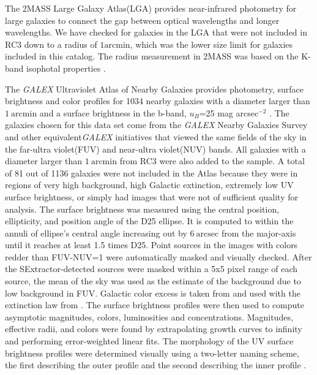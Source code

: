 \documentclass[12pt,preprint,pdftex]{aastex}
\newcommand{\units}[1]{\mathrm{#1}}
\renewcommand{\arcmin}{\units{arcmin}}
\renewcommand{\arcsec}{\units{arcsec}}
\begin{document}
The 2MASS Large Galaxy Atlas(LGA) provides near-infrared photometry for large galaxies to connect the gap between optical wavelengths and longer wavelengths. We have checked for galaxies in the LGA that were not included in RC3 down to a radius of $1\arcmin$, which was the lower size limit for galaxies included in this catalog. The radius measurement in 2MASS was based on the K-band isophotal properties \citep{jarrett03}.  

The \textit{GALEX} Ultraviolet Atlas of Nearby Galaxies provides photometry, surface brightness and color profiles for 1034 nearby galaxies with a diameter larger than $1~\arcmin$ and a surface brightness in the b-band, $u_B$=25 mag arcsec$^{-2}$ . The galaxies chosen for this data set come from the \textit{GALEX} Nearby Galaxies Survey and other equivalent\textit{GALEX} initiatives that viewed the same fields of the sky in the far-ultra violet(FUV) and near-ultra violet(NUV) bands. All galaxies with a diameter larger than $1~\arcmin$ from RC3 were also added to the sample. A total of 81 out of 1136 galaxies were not included in the Atlas because they were in regions of very high background, high Galactic extinction, extremely low UV surface brightness, or simply had images that were not of sufficient quality for analysis. The surface brightness was measured using the central position, ellipticity, and position angle of the D25 ellipse. It is computed to within the annuli of ellipse's central angle increasing out by $6~\arcsec$ from the major-axis until it reaches at least 1.5 times D25. Point sources in the images with colors redder than FUV-NUV=1 were automatically masked and visually checked. After the SExtractor-detected sources were masked within a 5x5 pixel range of each source, the mean of the sky was used as the estimate of the background due to low background in FUV. Galactic color excess is taken from \cite{schlegel98} and used with the extinction law from \cite{cardelli}. The surface brightness profiles were then used to compute asymptotic magnitudes, colors, luminosities and concentrations. Magnitudes, effective radii, and colors were found by extrapolating growth curves to infinity and performing error-weighted linear fits. The morphology of the UV surface brightness profiles were determined visually using a two-letter naming scheme, the first describing the outer profile and the second describing the inner profile \citep{gdp06}.

\end{document}
